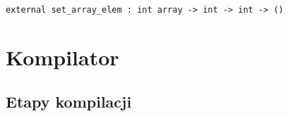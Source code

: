 \documentclass[declaration,shortabstract]{iithesis}
\begin{document}
\begin{lstlisting}[frame=single, caption=Interfejs zewnętrzny.]
external set_array_elem : int array -> int -> int -> () 
\end{lstlisting}








\chapter{Kompilator}
\section{Etapy kompilacji}
\end{document}
